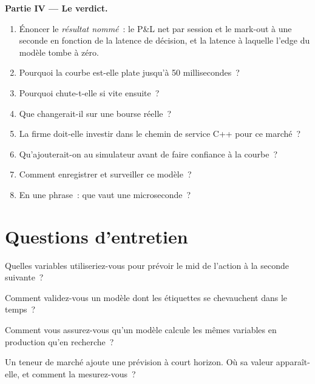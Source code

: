 \begin{problem}
\medskip\noindent\textbf{Partie IV --- Le verdict.}
\begin{enumerate}[resume]
\item Énoncer le \emph{résultat nommé}~: le P\&L net par session et le mark-out à une seconde en fonction de la latence de décision, et la
latence à laquelle l'edge du modèle tombe à zéro.
\item Pourquoi la courbe est-elle plate jusqu'à 50 millisecondes~?
\item Pourquoi chute-t-elle si vite ensuite~?
\item Que changerait-il sur une bourse réelle~?
\item La firme doit-elle investir dans le chemin de service C++ pour ce marché~?
\item Qu'ajouterait-on au simulateur avant de faire confiance à la courbe~?
\item Comment enregistrer et surveiller ce modèle~?
\item En une phrase~: que vaut une microseconde~?
\end{enumerate}
\end{problem}

\section{Questions d'entretien}

\begin{interviewq}\label{iq:ml:build-an-order-book-model-end-to-end:1}
Quelles variables utiliseriez-vous pour prévoir le mid de l'action à la seconde suivante~?
\end{interviewq}

\begin{interviewq}\label{iq:ml:build-an-order-book-model-end-to-end:2}
Comment validez-vous un modèle dont les étiquettes se chevauchent dans le temps~?
\end{interviewq}

\begin{interviewq}\label{iq:ml:build-an-order-book-model-end-to-end:3}
Comment vous assurez-vous qu'un modèle calcule les mêmes variables en production qu'en recherche~?
\end{interviewq}

\begin{interviewq}\label{iq:ml:build-an-order-book-model-end-to-end:4}
Un teneur de marché ajoute une prévision à court horizon. Où sa valeur apparaît-elle, et comment la mesurez-vous~?
\end{interviewq}

